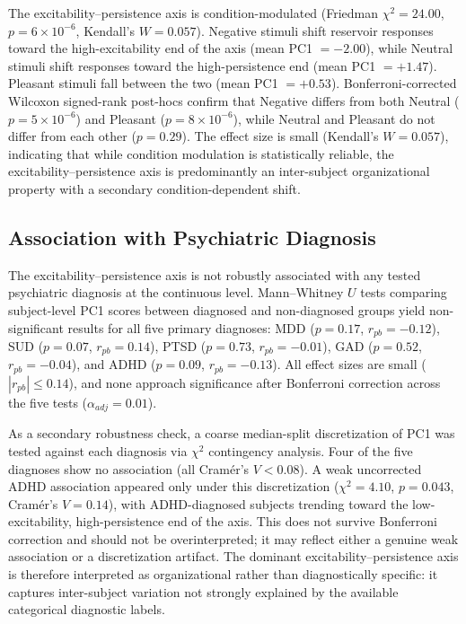 The excitability--persistence axis is condition-modulated (Friedman $\chi^2 = 24.00$, $p = 6 \times 10^{-6}$, Kendall's $W = 0.057$). Negative stimuli shift reservoir responses toward the high-excitability end of the axis (mean PC1 $= -2.00$), while Neutral stimuli shift responses toward the high-persistence end (mean PC1 $= +1.47$). Pleasant stimuli fall between the two (mean PC1 $= +0.53$). Bonferroni-corrected Wilcoxon signed-rank post-hocs confirm that Negative differs from both Neutral ($p = 5 \times 10^{-6}$) and Pleasant ($p = 8 \times 10^{-6}$), while Neutral and Pleasant do not differ from each other ($p = 0.29$). The effect size is small (Kendall's $W = 0.057$), indicating that while condition modulation is statistically reliable, the excitability--persistence axis is predominantly an inter-subject organizational property with a secondary condition-dependent shift.

\subsection{Association with Psychiatric Diagnosis}

The excitability--persistence axis is not robustly associated with any tested psychiatric diagnosis at the continuous level. Mann--Whitney $U$ tests comparing subject-level PC1 scores between diagnosed and non-diagnosed groups yield non-significant results for all five primary diagnoses: MDD ($p = 0.17$, $r_{pb} = -0.12$), SUD ($p = 0.07$, $r_{pb} = 0.14$), PTSD ($p = 0.73$, $r_{pb} = -0.01$), GAD ($p = 0.52$, $r_{pb} = -0.04$), and ADHD ($p = 0.09$, $r_{pb} = -0.13$). All effect sizes are small ($|r_{pb}| \leq 0.14$), and none approach significance after Bonferroni correction across the five tests ($\alpha_{adj} = 0.01$).

As a secondary robustness check, a coarse median-split discretization of PC1 was tested against each diagnosis via $\chi^2$ contingency analysis. Four of the five diagnoses show no association (all Cram\'{e}r's $V < 0.08$). A weak uncorrected ADHD association appeared only under this discretization ($\chi^2 = 4.10$, $p = 0.043$, Cram\'{e}r's $V = 0.14$), with ADHD-diagnosed subjects trending toward the low-excitability, high-persistence end of the axis. This does not survive Bonferroni correction and should not be overinterpreted; it may reflect either a genuine weak association or a discretization artifact. The dominant excitability--persistence axis is therefore interpreted as organizational rather than diagnostically specific: it captures inter-subject variation not strongly explained by the available categorical diagnostic labels.

